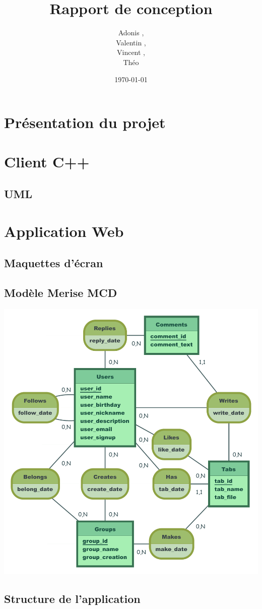 \documentclass[a4paper]{article}
\title{Rapport de conception}
\author{Adonis \bsc{Najimi},\\
 Valentin \bsc{Stern},\\
 Vincent \bsc{Albert},\\
 Théo \bsc{Gerriet}}
\date{\today}
\begin{document}
\maketitle
\section{Présentation du projet}
\section{Client C++}
\subsection{UML}
\section{Application Web}
\subsection{Maquettes d'écran}
\subsection{Modèle Merise MCD}
\includegraphics[scale=0.5]{MCD_MLD_Music}
\subsection{Structure de l'application}
\end{document}
